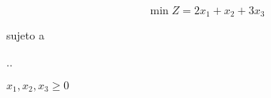 \documentclass[../main.tex]{subfiles}
\begin{document}


\begin{questions}
\question %

\[\min Z  = 2x_1 + x_2 + 3x_3    \]

{\centering
sujeto a 

\sysdelim..%
%

\vspace{3mm}
$x_1, x_2, x_3\geq 0$
\par}





\end{questions}
\end{document}
